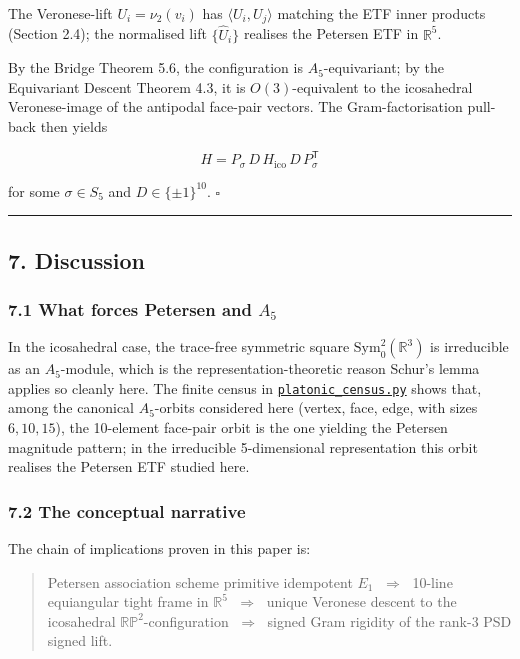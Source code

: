 \documentclass[
]{article}
\begin{document}
The Veronese-lift \(U_i = \nu_2(v_i)\) has \(\langle U_i, U_j\rangle\)
matching the ETF inner products (Section 2.4); the normalised lift
\(\{\hat U_i\}\) realises the Petersen ETF in \(\mathbb{R}^5\).

By the Bridge Theorem 5.6, the configuration is \(A_5\)-equivariant; by
the Equivariant Descent Theorem 4.3, it is \(O(3)\)-equivalent to the
icosahedral Veronese-image of the antipodal face-pair vectors. The
Gram-factorisation pull-back then yields

\[
H = P_\sigma\,D\,H_{\mathrm{ico}}\,D\,P_\sigma^{\mathsf T}
\]

for some \(\sigma \in S_5\) and \(D \in \{\pm 1\}^{10}\). \(\square\)

\begin{center}\rule{0.5\linewidth}{0.5pt}\end{center}

\subsection{7. Discussion}\label{discussion}

\subsubsection{\texorpdfstring{7.1 What forces Petersen and
\(A_5\)}{7.1 What forces Petersen and A\_5}}\label{what-forces-petersen-and-a_5}

In the icosahedral case, the trace-free symmetric square
\(\mathrm{Sym}^2_0(\mathbb{R}^3)\) is irreducible as an \(A_5\)-module,
which is the representation-theoretic reason Schur's lemma applies so
cleanly here. The finite census in
\href{../scripts/platonic_census.py}{\texttt{platonic\_census.py}} shows
that, among the canonical \(A_5\)-orbits considered here (vertex, face,
edge, with sizes \(6, 10, 15\)), the 10-element face-pair orbit is the
one yielding the Petersen magnitude pattern; in the irreducible
5-dimensional representation this orbit realises the Petersen ETF
studied here.

\subsubsection{7.2 The conceptual
narrative}\label{the-conceptual-narrative}

The chain of implications proven in this paper is:

\begin{quote}
Petersen association scheme primitive idempotent \(E_1\)
\(\;\Rightarrow\;\) 10-line equiangular tight frame in \(\mathbb{R}^5\)
\(\;\Rightarrow\;\) unique Veronese descent to the icosahedral
\(\mathbb{RP}^2\)-configuration \(\;\Rightarrow\;\) signed Gram rigidity
of the rank-3 PSD signed lift.
\end{quote}
\end{document}
